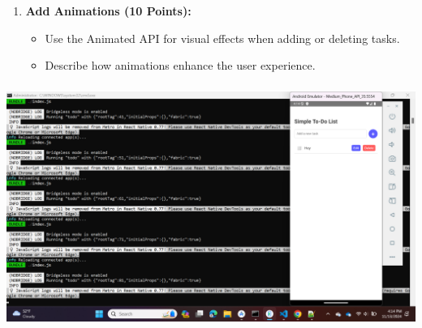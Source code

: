 \documentclass{article}
\begin{document}
\begin{enumerate}
    \item \textbf{Add Animations (10 Points):}
    \begin{itemize}
        \item Use the Animated API for visual effects when adding or deleting tasks.
        \item Describe how animations enhance the user experience.
    \end{itemize}
\end{enumerate}
\includegraphics[width=5.57813in,height=3.13391in]{media/image11.png}
\end{document}
